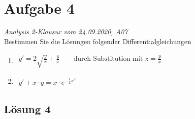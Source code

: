\documentclass[main.tex]{subfiles}
\begin{document}
\section{Aufgabe 4}
\textit{Analysis 2-Klausur vom 24.09.2020, A07}\\
Bestimmen Sie die Lösungen folgender Differentialgleichungen
\begin{enumerate}
\item 
$\begin{aligned}
	y' = 2\sqrt{\frac{y}{x}} + \frac{y}{x}
	\qquad \mbox{durch Substitution mit }
	z = \frac{y}{x}
\end{aligned}$
\item
$\begin{aligned}
	y' + x \cdot y = x \cdot e^{-\frac{1}{2}x^2}
\end{aligned}$
\end{enumerate}

\subsection{Lösung 4}
\end{document}
